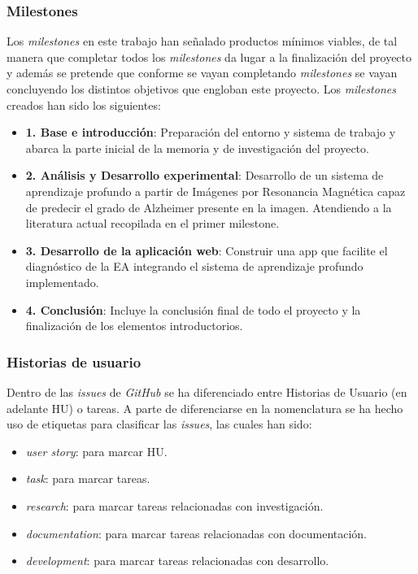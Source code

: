 \subsubsection{Milestones}
Los \textit{milestones} en este trabajo han señalado productos mínimos viables, de tal manera que completar todos los
\textit{milestones} da lugar a la finalización del proyecto y además se pretende que conforme se vayan completando
\textit{milestones} se vayan concluyendo los distintos objetivos que engloban este proyecto.
Los \textit{milestones} creados han sido los siguientes:
\begin{itemize}
    \item  \textbf{1. Base e introducción}: Preparación del entorno y sistema de trabajo y abarca la parte inicial de la
    memoria y de investigación del proyecto.
    \item \textbf{2. Análisis y Desarrollo experimental}: Desarrollo de un sistema de aprendizaje profundo a partir de
    Imágenes por Resonancia Magnética capaz de predecir el grado de Alzheimer presente en la imagen.
    Atendiendo a la literatura actual recopilada en el primer milestone.
    \item \textbf{3. Desarrollo de la aplicación web}: Construir una app que facilite el diagnóstico de la EA integrando el
    sistema de aprendizaje profundo implementado.
    \item \textbf{4. Conclusión}: Incluye la conclusión final de todo el proyecto y la finalización de los elementos
    introductorios.\\
\end{itemize}

\subsubsection{Historias de usuario}
Dentro de las \textit{issues} de \textit{GitHub} se ha diferenciado entre Historias de Usuario (en adelante \Gls{HU}) o
tareas.
A parte de diferenciarse en la nomenclatura se ha hecho uso de etiquetas para clasificar las \textit{issues}, las cuales
han sido:

\begin{itemize}
    \item \textit{user story}: para marcar HU.
    \item \textit{task}: para marcar tareas.
    \item \textit{research}: para marcar tareas relacionadas con investigación.
    \item \textit{documentation}: para marcar tareas relacionadas con documentación.
    \item \textit{development}: para marcar tareas relacionadas con desarrollo. \\
\end{itemize}

